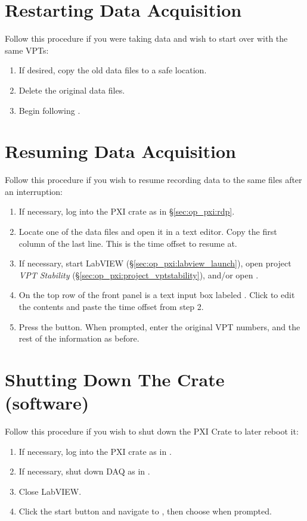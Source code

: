 \section{Restarting Data Acquisition}
\label{sec:op_pxi:daq_restart}

Follow this procedure if you were taking data and wish to start over with the same VPTs:
\begin{enumerate}
\item If desired, copy the old data files to a safe location.
\item Delete the original data files.
\item Begin following .
\end{enumerate}

\section{Resuming Data Acquisition}
\label{sec:op_pxi:daq_resume}

Follow this procedure if you wish to resume recording data to the same files after an interruption:
\begin{enumerate}
\item If necessary, log into the PXI crate as in \S\ref{sec:op_pxi:rdp}.
\item Locate one of the data files and open it in a text editor.  Copy the first column of the last line.  This is the time offset to resume at.
\item If necessary, start LabVIEW (\S\ref{sec:op_pxi:labview_launch}), open project \textit{VPT Stability} (\S\ref{sec:op_pxi:project_vptstability}), and/or open .
\item On the top row of the  front panel is a text input box labeled .  Click to edit the contents and paste the time offset from step 2.
\item Press the   button.  When prompted, enter the original VPT numbers, and the rest of the information as before.
\end{enumerate}


\section{Shutting Down The Crate (software)}
\label{sec:op_pxi:shutdown_software}

Follow this procedure if you wish to shut down the PXI Crate to later reboot it:
\begin{enumerate}
\item If necessary, log into the PXI crate as in .
\item If necessary, shut down DAQ as in .
\item Close LabVIEW.
\item Click the start button and navigate to , then choose  when prompted.
\end{enumerate}

